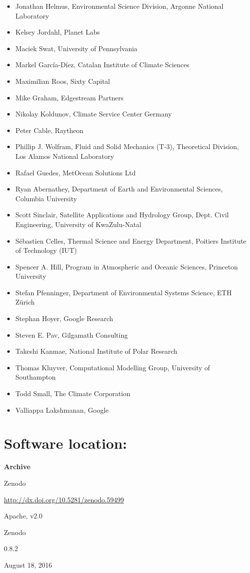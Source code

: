 \documentclass{jors}
\begin{document}
\begin{itemize}
\item Jonathan Helmus, Environmental Science Division, Argonne National Laboratory
\item Kelsey Jordahl, Planet Labs
\item Maciek Swat, University of Pennsylvania
\item Markel García-Díez, Catalan Institute of Climate Sciences
\item Maximilian Roos, Sixty Capital
\item Mike Graham, Edgestream Partners
\item Nikolay Koldunov, Climate Service Center Germany
\item Peter Cable, Raytheon
\item Phillip J. Wolfram, Fluid and Solid Mechanics (T-3), Theoretical Division, Los Alamos National Laboratory
\item Rafael Guedes, MetOcean Solutions Ltd
\item Ryan Abernathey, Department of Earth and Environmental Sciences, Columbia University
\item Scott Sinclair, Satellite Applications and Hydrology Group, Dept. Civil Engineering, University of KwaZulu-Natal
\item Sébastien Celles, Thermal Science and Energy Department, Poitiers Institute of Technology (IUT)
\item Spencer A. Hill, Program in Atmospheric and Oceanic Sciences, Princeton University
\item Stefan Pfenninger, Department of Environmental Systems Science, ETH Zürich
\item Stephan Hoyer, Google Research
\item Steven E. Pav, Gilgamath Consulting
\item Takeshi Kanmae, National Institute of Polar Research
\item Thomas Kluyver, Computational Modelling Group, University of Southampton
\item Todd Small, The Climate Corporation
\item Valliappa Lakshmanan, Google
\end{itemize}

\section*{Software location:}

{\bf Archive}

\begin{description}[noitemsep,topsep=0pt]
	\item[Name:] Zenodo
	\item[Persistent identifier:] \url{http://dx.doi.org/10.5281/zenodo.59499}
	\item[Licence:] Apache, v2.0
	\item[Publisher:]  Zenodo
	\item[Version published:] 0.8.2
	\item[Date published:] August 18, 2016
\end{description}
\end{document}
